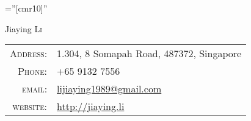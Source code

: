 \documentclass[a4paper,10pt]{article}
\begin{document}
\pagestyle{empty} %

\font\fb=''[cmr10]'' %

\par{\centering
		{\Huge Jiaying \textsc{Li}
	}
\bigskip
\par}


\begin{tabular}{rl}
    \textsc{Address:}   & 1.304, 8 Somapah Road, 487372, Singapore\\
    \textsc{Phone:}     & +65 9132 7556\\
    \textsc{email:}     & \href{mailto:lijiaying1989@gmail.com}{lijiaying1989@gmail.com}\\
	\textsc{website:}   &  \href{http://jiaying.li}{http://jiaying.li}
\end{tabular}

\end{document}
